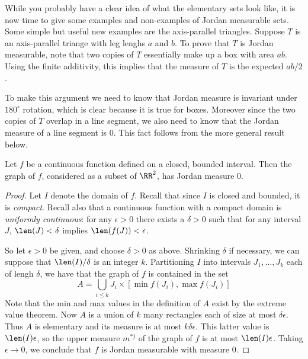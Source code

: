 While you probably have a clear idea of what the elementary sets look like, it is now time to give some examples and non-examples of Jordan measurable sets. Some simple but useful new examples are the axis-parallel triangles. Suppose $T$ is an axis-parallel triange with leg lenghs $a$ and $b$. To prove that $T$ is Jordan measurable, note that two copies of $T$ essentially make up a box with area $ab$. Using the finite additivity, this implies that the measure of $T$ is the expected $ab/2$.

To make this argument we need to know that Jordan measure is invariant under $180^\circ$ rotation, which is clear because it is true for boxes. Moreover since the two copies of $T$ overlap in a line segment, we also need to know that the Jordan measure of a line segment is $0$. This fact follows from the more general result below.


\begin{lem}
  \label{lem:jordan-graph}
  Let $f$ be a continuous function defined on a closed, bounded interval. Then the graph of $f$, considered as a subset of $\RR^2$, has Jordan measure $0$.
\end{lem}

\begin{proof}
  Let $I$ denote the domain of $f$. Recall that since $I$ is closed and bounded, it is \emph{compact}. Recall also that a continuous function with a compact domain is \emph{uniformly continuous}: for any $\epsilon>0$ there exists a $\delta>0$ such that for any interval $J$, $\len(J)<\delta$ implies $\len(f(J))<\epsilon$.

  So let $\epsilon>0$ be given, and choose $\delta>0$ as above. Shrinking $\delta$ if necessary, we can suppose that $\len(I)/\delta$ is an integer $k$. Partitioning $I$ into intervals $J_1,\ldots,J_k$ each of lengh $\delta$, we have that the graph of $f$ is contained in the set
  \[A=\bigcup_{i\leq k} J_i\times[\min f(J_i),\max f(J_i)]
  \]
  Note that the min and max values in the definition of $A$ exist by the extreme value theorem. Now $A$ is a union of $k$ many rectangles each of size at most $\delta\epsilon$. Thus $A$ is elementary and its measure is at most $k\delta\epsilon$. This latter value is $\len(I)\epsilon$, so the upper measure $m^{*j}$ of the graph of $f$ is at most $\len(I)\epsilon$. Taking $\epsilon\to0$, we conclude that $f$ is Jordan measurable with measure $0$.
\end{proof}

